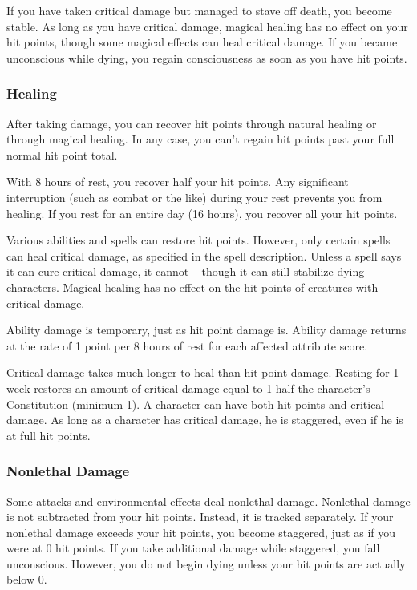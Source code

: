 \label{Stable}
If you have taken critical damage but managed to stave off death, you become stable. As long as you have critical damage, magical healing has no effect on your hit points, though some magical effects can heal critical damage. If you became unconscious while dying, you regain consciousness as soon as you have hit points.

\subsubsection{Healing}
After taking damage, you can recover hit points through natural healing or through magical healing. In any case, you can't regain hit points past your full normal hit point total.

 With 8 hours of rest, you recover half your hit points. Any significant interruption (such as combat or the like) during your rest prevents you from healing. If you rest for an entire day (16 hours), you recover all your hit points.

 Various abilities and spells can restore hit points. However, only certain spells can heal critical damage, as specified in the spell description. Unless a spell says it can cure critical damage, it cannot -- though it can still stabilize dying characters. Magical healing has no effect on the hit points of creatures with critical damage.

 Ability damage is temporary, just as hit point damage is. Ability damage returns at the rate of 1 point per 8 hours of rest for each affected attribute score.

 Critical damage takes much longer to heal than hit point damage. Resting for 1 week restores an amount of critical damage equal to 1 \add half the character's Constitution (minimum 1). A character can have both hit points and critical damage. As long as a character has critical damage, he is staggered, even if he is at full hit points.

\subsubsection{Nonlethal Damage}\label{Nonlethal Damage}
Some attacks and environmental effects deal nonlethal damage. Nonlethal damage is not subtracted from your hit points. Instead, it is tracked separately. If your nonlethal damage exceeds your hit points, you become staggered, just as if you were at 0 hit points. If you take additional damage while staggered, you fall unconscious. However, you do not begin dying unless your hit points are actually below 0. 

